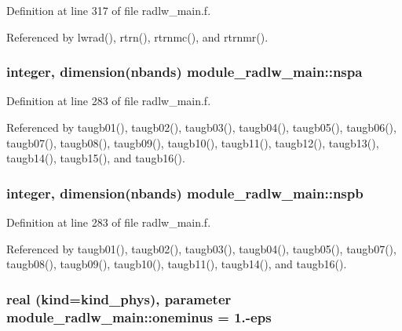 Definition at line 317 of file radlw\+\_\+main.\+f.



Referenced by lwrad(), rtrn(), rtrnmc(), and rtrnmr().

\subsubsection[{\texorpdfstring{nspa}{nspa}}]{\setlength{\rightskip}{0pt plus 5cm}integer, dimension(nbands) module\+\_\+radlw\+\_\+main\+::nspa\hspace{0.3cm}{\ttfamily [private]}}\hypertarget{namespacemodule__radlw__main_a42bbf62b5d91586f17d352af74e3c032}{}\label{namespacemodule__radlw__main_a42bbf62b5d91586f17d352af74e3c032}


Definition at line 283 of file radlw\+\_\+main.\+f.



Referenced by taugb01(), taugb02(), taugb03(), taugb04(), taugb05(), taugb06(), taugb07(), taugb08(), taugb09(), taugb10(), taugb11(), taugb12(), taugb13(), taugb14(), taugb15(), and taugb16().

\subsubsection[{\texorpdfstring{nspb}{nspb}}]{\setlength{\rightskip}{0pt plus 5cm}integer, dimension(nbands) module\+\_\+radlw\+\_\+main\+::nspb\hspace{0.3cm}{\ttfamily [private]}}\hypertarget{namespacemodule__radlw__main_a520be8a7f308d9e2c8e88b185170404e}{}\label{namespacemodule__radlw__main_a520be8a7f308d9e2c8e88b185170404e}


Definition at line 283 of file radlw\+\_\+main.\+f.



Referenced by taugb01(), taugb02(), taugb03(), taugb04(), taugb05(), taugb07(), taugb08(), taugb09(), taugb10(), taugb11(), taugb14(), and taugb16().

\subsubsection[{\texorpdfstring{oneminus}{oneminus}}]{\setlength{\rightskip}{0pt plus 5cm}real (kind=kind\+\_\+phys), parameter module\+\_\+radlw\+\_\+main\+::oneminus = 1.-\/{\bf eps}\hspace{0.3cm}{\ttfamily [private]}}\hypertarget{namespacemodule__radlw__main_a8c35a92c2a08663ce04bdf9de8717247}{}\label{namespacemodule__radlw__main_a8c35a92c2a08663ce04bdf9de8717247}



